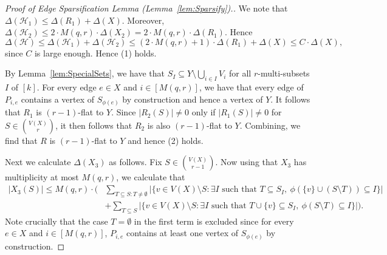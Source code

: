 \documentclass[11pt]{article}
\newcounter{i}
\theoremstyle{plain}
\theoremstyle{plain} %
\theoremstyle{definition}
\begin{document}
\begin{proof}[Proof of Edge Sparsification Lemma (Lemma~\ref{lem:Sparsify}).]
We note that $\Delta(\mathcal{H}_1)\le \Delta(R_1)+\Delta(X)$. Moreover, $\Delta(\mathcal{H}_2)\le 2\cdot M(q,r) \cdot \Delta(X_2) = 2\cdot M(q,r)\cdot \Delta(R_1)$. Hence
$$\Delta(\mathcal{H}) \le \Delta(\mathcal{H}_1)+\Delta(\mathcal{H}_2)\le (2\cdot M(q,r)+1)\cdot \Delta(R_1)+\Delta(X) \le C\cdot \Delta(X),$$
since $C$ is large enough. Hence (1) holds.

By Lemma~\ref{lem:SpecialSets}, we have that $S_I\subseteq Y\setminus \bigcup_{i\in I} V_i$ for all $r$-multi-subsets $I$ of $[k]$. For every edge $e\in X$ and $i\in [M(q,r)]$, we have that every edge of $P_{i,e}$ contains a vertex of $S_{\phi(e)}$ by construction and hence a vertex of $Y$. It follows that $R_1$ is $(r-1)$-flat to $Y$. Since $|R_2(S)|\ne 0$ only if $|R_1(S)|\ne 0$ for $S\in \binom{V(X)}{r}$, it then follows that $R_2$ is also $(r-1)$-flat to $Y$. Combining, we find that $R$ is $(r-1)$-flat to $Y$ and hence (2) holds. 

Next we calculate $\Delta(X_3)$ as follows. Fix $S\in \binom{V(X)}{r-1}$. Now using that $X_3$ has multiplicity at most $M(q,r)$, we calculate that
\begin{align*}
|X_3(S)|\le M(q,r)\cdot \bigg( &\sum_{T\subseteq S: T\ne \emptyset} |\{v\in V(X)\setminus S: \exists I\text{ such that } T\subseteq S_I,~\phi(\{v\}\cup (S\setminus T)) \subseteq I\}| \\
&+ \sum_{T\subseteq S} |\{v\in V(X)\setminus S: \exists I\text{ such that } T\cup \{v\}\subseteq S_I,~\phi(S\setminus T) \subseteq I\}| \bigg).
\end{align*}
Note crucially that the case $T=\emptyset$ in the first term is excluded since for every $e\in X$ and $i\in [M(q,r)]$, $P_{i,e}$ contains at least one vertex of $S_{\phi(e)}$ by construction.


\end{proof}
\end{document}
